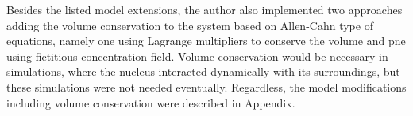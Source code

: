 Besides the listed model extensions, the author also implemented two approaches adding the volume conservation to the system based on Allen-Cahn type of equations, namely one using Lagrange multipliers to conserve the volume and pne using fictitious concentration field. Volume conservation would be necessary in simulations, where the nucleus interacted dynamically with its surroundings, but these simulations were not needed eventually. Regardless, the model modifications including volume conservation were described in Appendix.

\cleardoublepage

